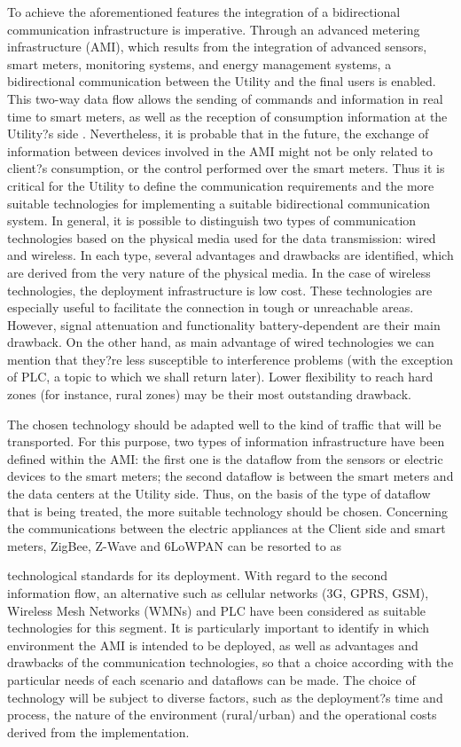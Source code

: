 \documentclass[11pt,final,onecolumn]{IEEEtran}
\begin{document}
To achieve the aforementioned features the integration of a bidirectional communication infrastructure is imperative. Through an advanced metering infrastructure (AMI), which results from the integration of advanced sensors, smart meters, monitoring systems, and energy management systems, a bidirectional communication between the Utility and the final users is enabled. This two-way data flow allows the sending of commands and information in real time to smart meters, as well as the reception of consumption information at the Utility?s side  \cite{Deconinck2008}. Nevertheless, it is probable that in the future, the exchange of information between devices involved in the AMI might not be only related to client?s consumption, or the control performed over the smart meters. Thus it is critical for the Utility to define the communication requirements and the more suitable technologies for implementing a suitable bidirectional communication system. In general, it is possible to distinguish two types of communication technologies based on the physical media used for the data transmission: wired and wireless. In each type, several advantages and drawbacks are identified, which are derived from the very nature of the physical media. In the case of wireless technologies, the deployment infrastructure is low cost. These technologies are especially useful to facilitate the connection in tough or unreachable areas. However, signal attenuation and functionality battery-dependent are their main drawback. On the other hand, as main advantage of wired technologies we can mention that they?re less susceptible to interference problems (with the exception of PLC, a topic to which we shall return later). Lower flexibility to reach hard zones (for instance, rural zones) may be their most outstanding drawback.

The chosen technology should be adapted well to the kind of traffic that will be transported. For this purpose, two types of information infrastructure have been defined within the AMI: the first one is the dataflow from the sensors or electric devices to the smart meters; the second dataflow is between the smart meters and the data centers at the Utility side. Thus, on the basis of the type of dataflow that is being treated, the more suitable technology should be chosen. Concerning the communications between the electric appliances at the Client side and smart meters, ZigBee, Z-Wave and 6LoWPAN can be resorted to as 

technological standards for its deployment. With regard to the second information flow, an alternative such as cellular networks (3G, GPRS, GSM), Wireless Mesh Networks (WMNs) and PLC have been considered as suitable technologies for this segment. 
It is particularly important to identify in which environment the AMI is intended to be deployed, as well as advantages and drawbacks of the communication technologies, so that a choice according with the particular needs of each scenario and dataflows can be made. The choice of technology will be subject to diverse factors, such as the deployment?s time and process, the nature of the environment (rural/urban) and the operational costs derived from the implementation.
\end{document}
